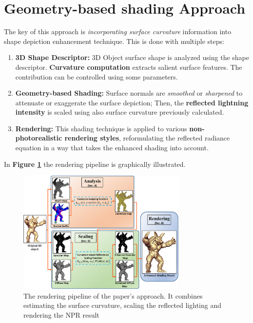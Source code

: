 \section{Geometry-based shading Approach}
The key of this approach is  \textit{incorporating surface curvature} information into shape depiction enhancement technique. This is done with multiple steps:
\begin{enumerate}
	\item  \textbf{3D Shape Descriptor:} 3D Object surface shape is analyzed using the shape descriptor. \textbf{Curvature computation} extracts salient surface features. The contribution can be controlled using some parameters.
	\item \textbf{Geometry-based Shading:} Surface normals are \textit{smoothed} or \textit{sharpened} to attenuate or exaggerate the surface depiction; Then, the \textbf{reflected lightning intensity} is scaled using also surface curvature previously calculated.
	\item \textbf{Rendering:} This shading technique is applied to various \textbf{non-photorealistic rendering styles}, reformulating the reflected radiance equation in a way that takes the enhanced shading into account.
\end{enumerate}
In \textbf{Figure \ref{fig:method}} the rendering pipeline is graphically illustrated.
\begin{figure}[h]
	\centering
	\includegraphics[width=0.75\textwidth]{Images/method.png}
	\caption{The rendering pipeline of the paper's approach. It combines estimating the surface curvature, scaling the reflected lighting and rendering the NPR result}
	\label{fig:method}
\end{figure}